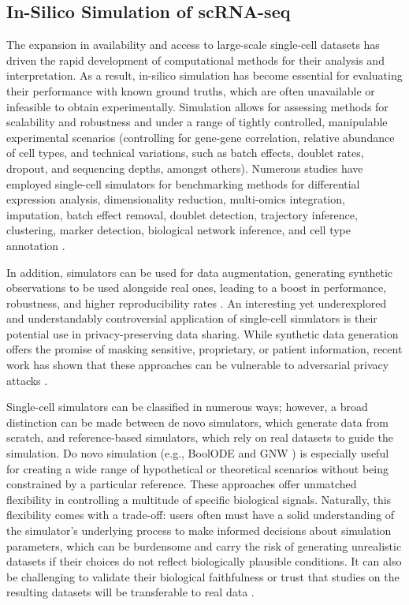 \subsection*{In-Silico Simulation of scRNA-seq}
The expansion in availability and access to large-scale single-cell datasets has driven the rapid development of computational methods for their analysis and interpretation. As a result, in-silico simulation has become essential for evaluating their performance with known ground truths, which are often unavailable or infeasible to obtain experimentally. Simulation allows for assessing methods for scalability and robustness and under a range of tightly controlled, manipulable experimental scenarios (controlling for gene-gene correlation, relative abundance of cell types, and technical variations, such as batch effects, doublet rates, dropout, and sequencing depths, amongst others). Numerous studies have employed single-cell simulators for benchmarking methods for differential expression analysis, dimensionality reduction, multi-omics integration, imputation, batch effect removal, doublet detection, trajectory inference, clustering, marker detection, biological network inference, and cell type annotation \cite{cao2021benchmark, crowell2023shaky}. 

In addition, simulators can be used for data augmentation, generating synthetic observations to be used alongside real ones, leading to a boost in performance, robustness, and higher reproducibility rates \cite{marouf2020realistic}. An interesting yet underexplored and understandably controversial application of single-cell simulators is their potential use in privacy-preserving data sharing. While synthetic data generation offers the promise of masking sensitive, proprietary, or patient information, recent work has shown that these approaches can be vulnerable to adversarial privacy attacks \cite{golob2026privacy}. 

Single-cell simulators can be classified in numerous ways; however, a broad distinction can be made between de novo simulators, which generate data from scratch, and reference-based simulators, which rely on real datasets to guide the simulation. Do novo simulation (e.g., BoolODE \cite{pratapa2020benchmarking} and GNW \cite{schaffter2011genenetweaver}) is especially useful for creating a wide range of hypothetical or theoretical scenarios without being constrained by a particular reference. These approaches offer unmatched flexibility in controlling a multitude of specific biological signals. Naturally, this flexibility comes with a trade-off: users often must have a solid understanding of the simulator’s underlying process to make informed decisions about simulation parameters, which can be burdensome and carry the risk of generating unrealistic datasets if their choices do not reflect biologically plausible conditions. It can also be challenging to validate their biological faithfulness or trust that studies on the resulting datasets will be transferable to real data \cite{crowell2023shaky}.  

